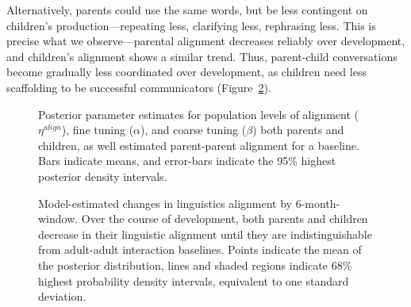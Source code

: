 \documentclass[10pt,letterpaper]{article}
\begin{document}
Alternatively, parents could use the same words, but be less contingent on children's production---repeating less, clarifying less, rephrasing less. This is precise what we observe---parental alignment decreases reliably over development, and children's alignment shows a similar trend. Thus, parent-child conversations become gradually less coordinated over development, as children need less scaffolding to be successful communicators (Figure~\ref{fig:all_hpds}).

\begin{figure}[tb]
  \caption{\label{fig:model_parameters} Posterior parameter estimates for population levels of alignment ($\eta^{align}$), fine tuning ($\alpha$), and coarse tuning ($\beta$) both parents and children, as well estimated parent-parent alignment for a baseline. Bars indicate means, and error-bars indicate the 95\% highest posterior density intervals.}
\end{figure}

\begin{figure}[t]
	\caption{Model-estimated changes in linguistics alignment by 6-month-window. Over the course of development, both parents and children decrease in their linguistic alignment until they are indistinguishable from adult-adult interaction baselines. Points indicate the mean of the posterior distribution, lines and shaded regions indicate 68\% highest probability density intervals, equivalent to one standard deviation. 
\label{fig:all_hpds} }
\end{figure}
\end{document}
